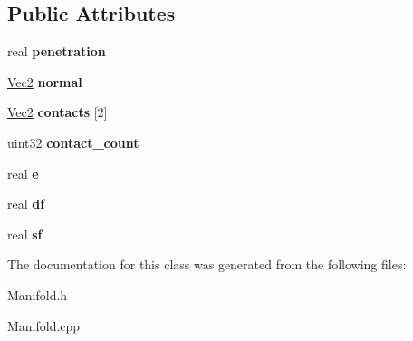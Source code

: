 \subsection*{Public Attributes}
\begin{DoxyCompactItemize}
\item 
\mbox{\label{class_manifold_a058391b5a2e745467c3da071408e631f}} 
real {\bfseries penetration}
\item 
\mbox{\label{class_manifold_a08837c3bbf15c2dd1cb51d984698ab46}} 
\mbox{\hyperlink{struct_vec2}{Vec2}} {\bfseries normal}
\item 
\mbox{\label{class_manifold_a0f3863f327800fdf7b5bfab8db88a6dc}} 
\mbox{\hyperlink{struct_vec2}{Vec2}} {\bfseries contacts} \mbox{[}2\mbox{]}
\item 
\mbox{\label{class_manifold_af98bbea7321829c3547ec8365f40f068}} 
uint32 {\bfseries contact\+\_\+count}
\item 
\mbox{\label{class_manifold_a7eb7fecdb3dbac0ad387ac9893f91180}} 
real {\bfseries e}
\item 
\mbox{\label{class_manifold_ac8b98d3211f99d8997b96a5c95ba80f1}} 
real {\bfseries df}
\item 
\mbox{\label{class_manifold_ad7ccd59e59bb27f236ea6a2d05a765e4}} 
real {\bfseries sf}
\end{DoxyCompactItemize}


The documentation for this class was generated from the following files\+:\begin{DoxyCompactItemize}
\item 
Manifold.\+h\item 
Manifold.\+cpp\end{DoxyCompactItemize}

